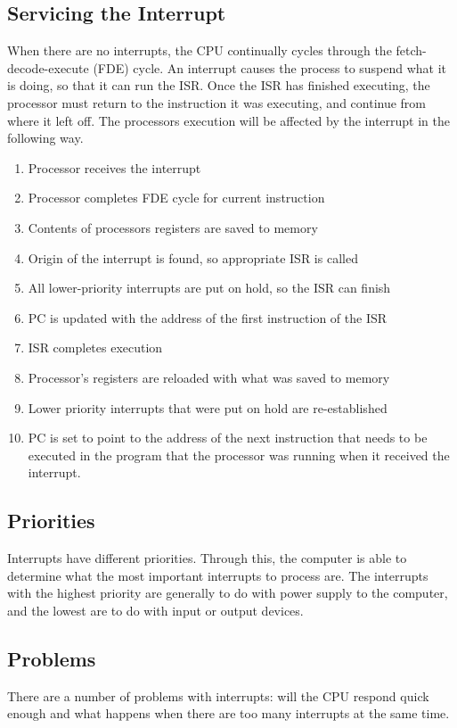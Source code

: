 \documentclass[a4paper,11pt, twocolumn]{article}
\begin{document}
\subsection{Servicing the Interrupt}
When there are no interrupts, the CPU continually cycles through the fetch-decode-execute (FDE) cycle. An interrupt causes the process to suspend what it is doing, so that it can run the ISR. Once the ISR has finished executing, the processor must return to the instruction it was executing, and continue from where it left off. The processors execution will be affected by the interrupt in the following way.
\begin{enumerate}
    \item Processor receives the interrupt
    \item Processor completes FDE cycle for current instruction
    \item Contents of processors registers are saved to memory
    \item Origin of the interrupt is found, so appropriate ISR is called
    \item All lower-priority interrupts are put on hold, so the ISR can finish
    \item PC is updated with the address of the first instruction of the ISR
    \item ISR completes execution
    \item Processor's registers are reloaded with what was saved to memory
    \item Lower priority interrupts that were put on hold are re-established
    \item PC is set to point to the address of the next instruction that needs to be executed in the program that the processor was running when it received the interrupt.
\end{enumerate}
\subsection{Priorities}
Interrupts have different priorities. Through this, the computer is able to determine what the most important interrupts to process are. The interrupts with the highest priority are generally to do with power supply to the computer, and the lowest are to do with input or output devices. 
\subsection{Problems}
There are a number of problems with interrupts: will the CPU respond quick enough and what happens when there are too many interrupts at the same time.
\end{document}
